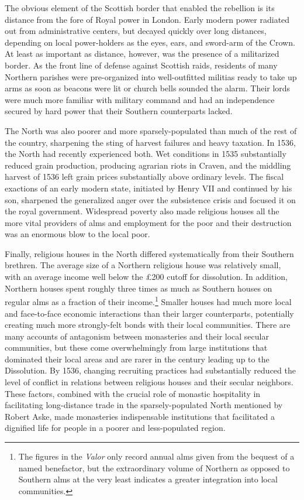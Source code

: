 \documentclass[12pt]{article}
\begin{document}
The obvious element of the Scottish border that enabled the rebellion is its distance from the fore of Royal power in London. Early modern power radiated out from administrative centers, but decayed quickly over long distances, depending on local power-holders as the eyes, ears, and sword-arm of the Crown. At least as important as distance, however, was the presence of a militarized border. As the front line of defense against Scottish raids, residents of many Northern parishes were pre-organized into well-outfitted militias ready to take up arms as soon as beacons were lit or church bells sounded the alarm.\autocite[56]{Bush1996} Their lords were much more familiar with military command and had an independence secured by hard power that their Southern counterparts lacked.\autocite[]{Hoyle2001} 

The North was also poorer and more sparsely-populated than much of the rest of the country, sharpening the sting of harvest failures and heavy taxation. In 1536, the North had recently experienced both. Wet conditions in 1535 substantially reduced grain production, producing agrarian riots in Craven, and the middling harvest of 1536 left grain prices substantially above ordinary levels.\autocite[54]{Hoyle2001}\autocite[57]{Davies1968} The fiscal exactions of an early modern state, initiated by Henry VII and continued by his son, sharpened the generalized anger over the subsistence crisis and focused it on the royal government.\autocite[19]{Fletcher2008} Widespread poverty also made religious houses all the more vital providers of alms and employment for the poor and their destruction was an enormous blow to the local poor.\autocite[48]{Hoyle2001}

Finally, religious houses in the North differed systematically from their Southern brethren. The average size of a Northern religious house was relatively small, with an average income well below the \pounds200 cutoff for dissolution. In addition, Northern houses spent roughly three times as much as Southern houses on regular alms as a fraction of their income.\footnote{The figures in the \emph{Valor} only record annual alms given from the bequest of a named benefactor, but the extraordinary volume of Northern as opposed to Southern alms at the very least indicates a greater integration into local communities.} Smaller houses had much more local and face-to-face economic interactions than their larger counterparts, potentially creating much more strongly-felt bonds with their local communities. There are many accounts of antagonism between monasteries and their local secular communities, but these come overwhelmingly from large institutions that dominated their local areas and are rarer in the century leading up to the Dissolution. By 1536, changing recruiting practices had substantially reduced the level of conflict in relations between religious houses and their secular neighbors.\autocite[278-9]{Clark2009} These factors, combined with the crucial role of monastic hospitality in facilitating long-distance trade in the sparsely-populated North mentioned by Robert Aske, made monasteries indispensable institutions that facilitated a dignified life for people in a poorer and less-populated region.\autocite[44]{Bush1996}
\end{document}
